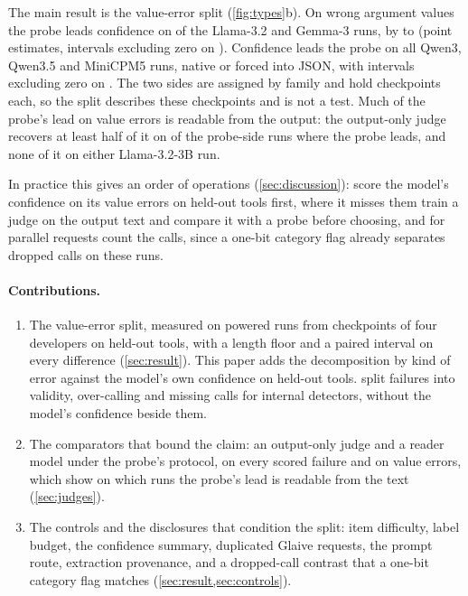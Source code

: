 The main result is the value-error split (\cref{fig:types}b). On wrong argument values the probe leads confidence on \nWavInternalsPos{} of the \nInternalsRuns{} Llama-3.2 and Gemma-3 runs, by \wavInternalsMin{} to \wavInternalsMax{} (point estimates, intervals excluding zero on \nWavInternalsCiExcl{}). Confidence leads the probe on all \nWavConfidenceRuns{} Qwen3, Qwen3.5 and MiniCPM5 runs, native or forced into JSON, with intervals excluding zero on \nWavConfidenceCiBelow{}. The two sides are assigned by family and hold \nCkptInternals{} checkpoints each, so the split describes these checkpoints and is not a test. Much of the probe's lead on value errors is readable from the output: the output-only judge recovers at least half of it on \nJwShareMajority{} of the \nJwEligible{} probe-side runs where the probe leads, and none of it on either Llama-3.2-3B run.

In practice this gives an order of operations (\cref{sec:discussion}): score the model's confidence on its value errors on held-out tools first, where it misses them train a judge on the output text and compare it with a probe before choosing, and for parallel requests count the calls, since a one-bit category flag already separates dropped calls on these runs.

\paragraph{Contributions.}
\begin{enumerate}[topsep=1pt,itemsep=1pt,leftmargin=1.3em]
\item The value-error split, measured on \nRunsPowered{} powered runs from \nCkpt{} checkpoints of four developers on held-out tools, with a length floor and a paired interval on every difference (\cref{sec:result}). This paper adds the decomposition by kind of error against the model's own confidence on held-out tools. \citet{ke2026neurons} split failures into validity, over-calling and missing calls for internal detectors, without the model's confidence beside them.
\item The comparators that bound the claim: an output-only judge and a reader model under the probe's protocol, on every scored failure and on value errors, which show on which runs the probe's lead is readable from the text (\cref{sec:judges}).
\item The controls and the disclosures that condition the split: item difficulty, label budget, the confidence summary, duplicated Glaive requests, the prompt route, extraction provenance, and a dropped-call contrast that a one-bit category flag matches (\cref{sec:result,sec:controls}).
\end{enumerate}

